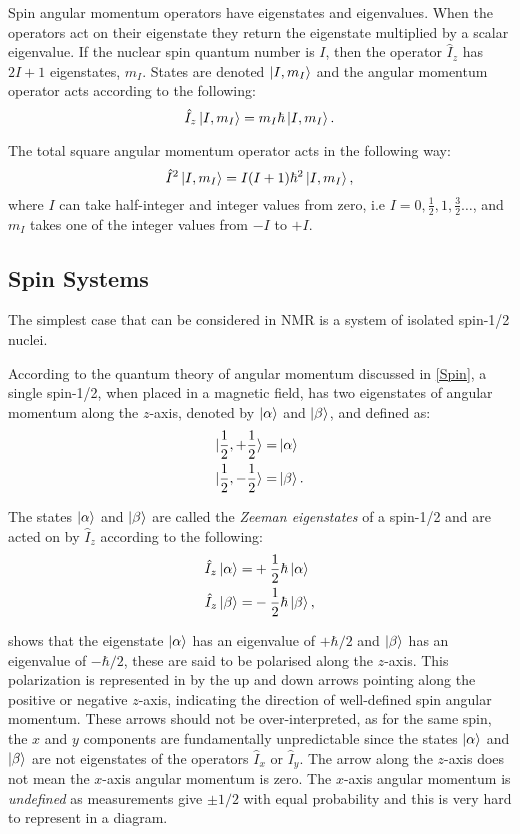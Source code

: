 Spin angular momentum operators have eigenstates and eigenvalues. When the operators act on their eigenstate
they return the eigenstate multiplied by a scalar eigenvalue. If the nuclear spin quantum number is $I$, then the operator $\hat{I}_z$ has $2I+1$
eigenstates, $m_I$. States are denoted $\ket{I,m_I}$ \citep{dirac_1939} and the angular momentum operator acts according to the following:
\begin{equation}
  \hat{I}_z\ket{I,m_I} = m_I\hbar\ket{I,m_I}.
\end{equation}

The total square angular momentum operator acts in the following way:
\begin{equation}
  \hat{I}^2\ket{I,m_I} = I(I+1)\hbar^2\ket{I,m_I},
\end{equation}
where $I$ can take half-integer and integer values from zero, i.e
$I = 0,\frac{1}{2},1,\frac{3}{2}\dots$, and $m_I$ takes one of the integer values from
$-I$ to $+I$.

\subsection{Spin Systems}\label{SpinStates}

The simplest case that can be considered in NMR is a system of isolated
spin-1/2 nuclei.

According to the quantum theory of angular momentum discussed in \ref{Spin}, a
single spin-1/2, when placed in a magnetic field, has two eigenstates of angular
momentum along the $z$-axis, denoted by $\ket{\alpha}$ and $\ket{\beta}$, and defined
as:
\begin{align}
  \ket{\frac{1}{2},+\frac{1}{2}} =& \ket{\alpha}\\
  \ket{\frac{1}{2},-\frac{1}{2}} =& \ket{\beta}.
 \end{align}

The states $\ket{\alpha}$ and $\ket{\beta}$ are called the \textit{Zeeman eigenstates}
of a spin-1/2 and are acted on by $\hat{I}_z$ according to the following:
\begin{align}\label{eqn:momentum}
  \hat{I}_z\ket{\alpha} =& +\frac{1}{2}\hbar\ket{\alpha}\\
  \hat{I}_z\ket{\beta} =& -\frac{1}{2}\hbar\ket{\beta},
\end{align}

 shows that the eigenstate $\ket{\alpha}$ has an eigenvalue of
$+\hbar/2$ and $\ket{\beta}$ has an eigenvalue of $-\hbar/2$, these are said to
be polarised along the $z$-axis. This polarization is represented in
 by the up and down arrows pointing along the positive
or negative $z$-axis, indicating the direction of well-defined spin angular momentum.
These arrows should not be over-interpreted, as for the same spin,
the $x$ and $y$ components are fundamentally unpredictable
since the states $\ket{\alpha}$ and $\ket{\beta}$ are not eigenstates of the operators
$\hat{I}_x$ or $\hat{I}_y$. The arrow along the $z$-axis does not mean the
$x$-axis angular momentum is zero. The $x$-axis angular momentum is \textit{undefined}
as measurements give $±1/2$ with equal probability and this is very hard to represent
in a diagram.

